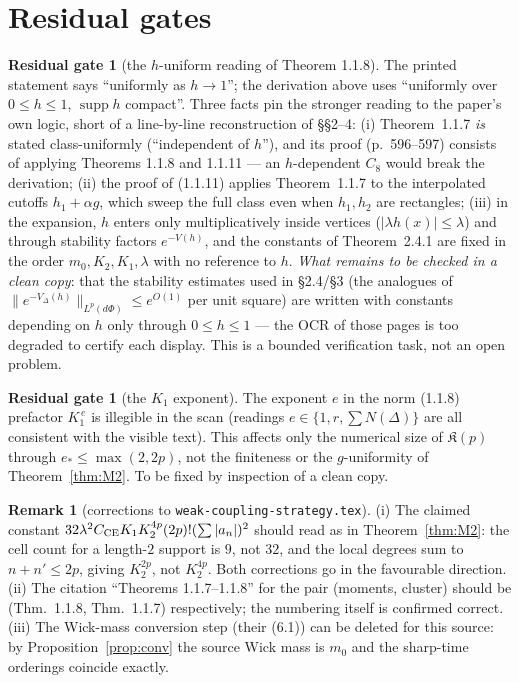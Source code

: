 \documentclass[11pt,a4paper]{article}
\theoremstyle{plain}
\theoremstyle{definition}
\newtheorem{remark}[theorem]{Remark}
\newtheorem{gate}[theorem]{Residual gate}
\DeclareMathOperator{\supp}{supp}
\begin{document}
\section{Residual gates}

\begin{gate}[the $h$-uniform reading of Theorem 1.1.8]\label{gate:R1}
The printed statement says ``uniformly as $h\to1$''; the derivation above uses ``uniformly over
$0\le h\le1$, $\supp h$ compact''. Three facts pin the stronger reading to the paper's own logic,
short of a line-by-line reconstruction of \S\S2--4: (i) Theorem~1.1.7 \emph{is} stated
class-uniformly (``independent of $h$''), and its proof (p.~596--597) consists of applying
Theorems 1.1.8 and 1.1.11 --- an $h$-dependent $C_8$ would break the derivation; (ii) the proof of
(1.1.11) applies Theorem~1.1.7 to the interpolated cutoffs $h_1+\alpha g$, which sweep the full
class even when $h_1,h_2$ are rectangles; (iii) in the expansion, $h$ enters only multiplicatively
inside vertices ($|\lambda h(x)|\le\lambda$) and through stability factors $e^{-V(h)}$, and the
constants of Theorem~2.4.1 are fixed in the order $m_0,K_2,K_1,\lambda$ with no reference to $h$.
\emph{What remains to be checked in a clean copy}: that the stability estimates used in \S2.4/\S3
(the analogues of $\|e^{-V_\Delta(h)}\|_{L^p(d\Phi)}\le e^{O(1)}$ per unit square) are written with
constants depending on $h$ only through $0\le h\le1$ --- the OCR of those pages is too degraded to
certify each display. This is a bounded verification task, not an open problem.
\end{gate}

\begin{gate}[the $K_1$ exponent]\label{gate:R2}
The exponent $e$ in the norm (1.1.8) prefactor $K_1^{\,e}$ is illegible in the scan (readings
$e\in\{1,r,\sum N(\Delta)\}$ are all consistent with the visible text). This affects only the
numerical size of $\mathfrak K(p)$ through $e_*\le\max(2,2p)$, not the finiteness or the
$g$-uniformity of Theorem~\ref{thm:M2}. To be fixed by inspection of a clean copy.
\end{gate}

\begin{remark}[corrections to \texttt{weak-coupling-strategy.tex}]\label{rem:corr}
(i) The claimed constant $32\lambda^2C_{\rm CE}K_1K_2^{4p}(2p)!(\sum|a_n|)^2$ should read as in
Theorem~\ref{thm:M2}: the cell count for a length-$2$ support is $9$, not $32$, and the local
degrees sum to $n+n'\le2p$, giving $K_2^{2p}$, not $K_2^{4p}$. Both corrections go in the
favourable direction. (ii) The citation ``Theorems 1.1.7--1.1.8'' for the pair (moments, cluster)
should be (Thm.~1.1.8, Thm.~1.1.7) respectively; the numbering itself is confirmed correct.
(iii) The Wick-mass conversion step (their (6.1)) can be deleted for this source: by
Proposition~\ref{prop:conv} the source Wick mass is $m_0$ and the sharp-time orderings coincide
exactly.
\end{remark}
\end{document}
